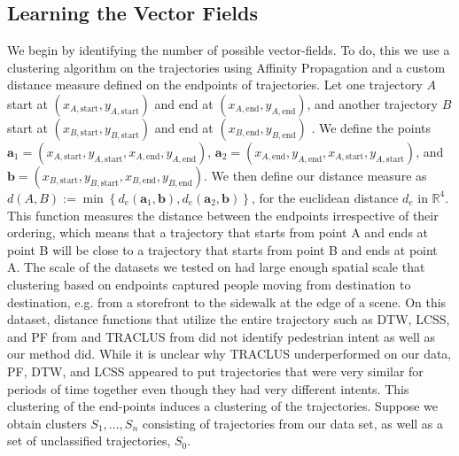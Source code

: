\documentclass[letterpaper,10pt,conference]{ieeeconf}
\begin{document}
  \subsection{Learning the Vector Fields}
 We begin by identifying the number of possible vector-fields.
To do, this we use a clustering algorithm on the trajectories using Affinity Propagation \cite{FreyDueck2007} and a custom distance measure defined on the endpoints of trajectories. 
	Let one trajectory $A$ start at $(x_{A,\mathrm{start}}, y_{A,\mathrm{start}})$ and end at  $(x_{A,\mathrm{end}}, y_{A,\mathrm{end}})$, and another trajectory $B$ start at $(x_{B,\mathrm{start}}, y_{B,\mathrm{start}})$ and end at $(x_{B,\mathrm{end}}, y_{B,\mathrm{end}})$ . 
	We define the points $\mathbf{a}_1 = (x_{A, \mathrm{start}}, y_{A, \mathrm{start}}, x_{A, \mathrm{end}}, y_{A, \mathrm{end}})$, $\mathbf{a}_2 = (x_{A, \mathrm{end}}, y_{A, \mathrm{end}}, x_{A, \mathrm{start}}, y_{A, \mathrm{start}})$, and $\mathbf{b} = (x_{B, \mathrm{start}}, y_{B, \mathrm{start}}, x_{B, \mathrm{end}}, y_{B, \mathrm{end}})$. 
	We then define our distance measure as $d(A, B) :=  \min \left\{ d_e(\mathbf{a}_1, \mathbf{b}), d_e(\mathbf{a}_2, \mathbf{b}) \right\}$, for the euclidean distance $d_e$ in $\mathbb{R}^4$. 
	This function measures the distance between the endpoints irrespective of their ordering, which means that a trajectory that starts from point A and ends at point B will be close to a trajectory that starts from point B and ends at point A.
	The scale of the datasets we tested on had large enough spatial scale that clustering based on endpoints captured people moving from destination to destination, e.g. from a storefront to the sidewalk at the edge of a scene. On this dataset, distance functions that utilize the entire trajectory such as DTW, LCSS, and PF from \cite{Morris2009} and TRACLUS from \cite{Lee2007} did not identify pedestrian intent as well as our method did. While it is unclear why TRACLUS underperformed on our data, PF, DTW, and LCSS appeared to put trajectories that were very similar for periods of time together even though they had very different intents.
	This clustering of the end-points induces a clustering of the trajectories.
  Suppose we obtain clusters $S_1, \dots, S_n$ consisting of trajectories from our data set, as well as a set of unclassified trajectories, $S_0$.
  
\end{document}
